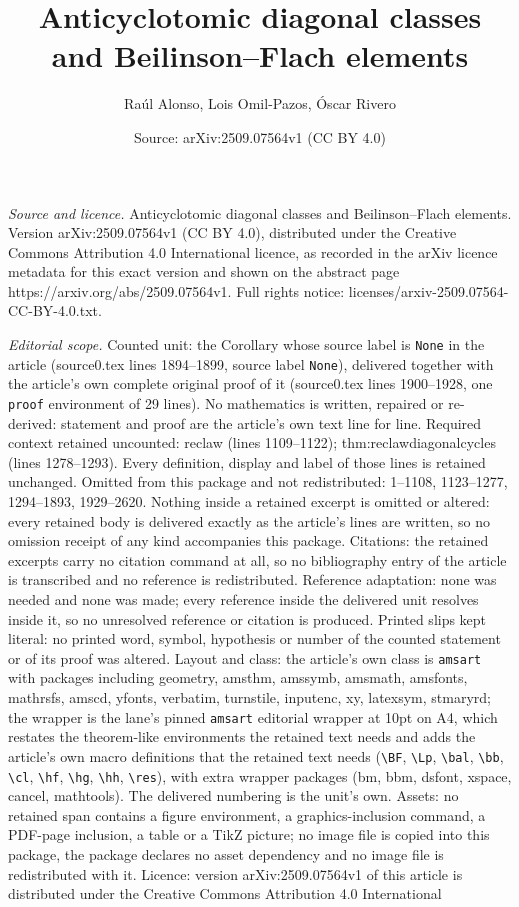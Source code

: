 \documentclass[10pt,a4paper]{amsart}
\title[Anticyclotomic diagonal classes and Beilinson--Flach element]{Anticyclotomic diagonal classes and Beilinson--Flach elements}
\author{Ra\'ul Alonso, Lois Omil-Pazos, \'Oscar Rivero}
\date{Source: arXiv:2509.07564v1 (CC BY 4.0)}
\begin{document}
\maketitle

\noindent\emph{Source and licence.} Anticyclotomic diagonal classes and Beilinson--Flach elements. Version arXiv:2509.07564v1 (CC BY 4.0), distributed under the Creative Commons Attribution 4.0 International licence, as recorded in the arXiv licence metadata for this exact version and shown on the abstract page https://arxiv.org/abs/2509.07564v1. Full rights notice: licenses/arxiv-2509.07564-CC-BY-4.0.txt.\par\smallskip

\noindent\textit{Editorial scope.} Counted unit: the Corollary whose source label is \texttt{None} in the article (source0.tex lines 1894--1899, source label \texttt{None}), delivered together with the article's own complete original proof of it (source0.tex lines 1900--1928, one \texttt{proof} environment of 29 lines). No mathematics is written, repaired or re-derived: statement and proof are the article's own text line for line. Required context retained uncounted: reclaw (lines 1109--1122); thm:reclawdiagonalcycles (lines 1278--1293). Every definition, display and label of those lines is retained unchanged. Omitted from this package and not redistributed: 1--1108, 1123--1277, 1294--1893, 1929--2620. Nothing inside a retained excerpt is omitted or altered: every retained body is delivered exactly as the article's lines are written, so no omission receipt of any kind accompanies this package. Citations: the retained excerpts carry no citation command at all, so no bibliography entry of the article is transcribed and no reference is redistributed. Reference adaptation: none was needed and none was made; every reference inside the delivered unit resolves inside it, so no unresolved reference or citation is produced. Printed slips kept literal: no printed word, symbol, hypothesis or number of the counted statement or of its proof was altered. Layout and class: the article's own class is \texttt{amsart} with packages including geometry, amsthm, amssymb, amsmath, amsfonts, mathrsfs, amscd, yfonts, verbatim, turnstile, inputenc, xy, latexsym, stmaryrd; the wrapper is the lane's pinned \texttt{amsart} editorial wrapper at 10pt on A4, which restates the theorem-like environments the retained text needs and adds the article's own macro definitions that the retained text needs (\texttt{\textbackslash BF}, \texttt{\textbackslash Lp}, \texttt{\textbackslash bal}, \texttt{\textbackslash bb}, \texttt{\textbackslash cl}, \texttt{\textbackslash hf}, \texttt{\textbackslash hg}, \texttt{\textbackslash hh}, \texttt{\textbackslash res}), with extra wrapper packages (bm, bbm, dsfont, xspace, cancel, mathtools). The delivered numbering is the unit's own. Assets: no retained span contains a figure environment, a graphics-inclusion command, a PDF-page inclusion, a table or a TikZ picture; no image file is copied into this package, the package declares no asset dependency and no image file is redistributed with it. Licence: version arXiv:2509.07564v1 of this article is distributed under the Creative Commons Attribution 4.0 International 
\end{document}
